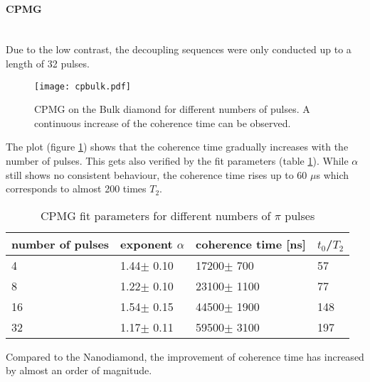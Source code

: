 \documentclass[12pt,a4paper]{article}
\begin{document}
\paragraph{CPMG}\mbox{}\\
Due to the low contrast, the decoupling sequences were only conducted up to a length of 32 pulses. \\
\begin{figure}[H]
\texttt{[image: cpbulk.pdf]} 
\caption{CPMG on the Bulk diamond for different numbers of pulses. A continuous increase of the coherence time can be observed.}
\label{cb}
\end{figure}
The plot (figure \ref{cb}) shows that the coherence time gradually increases with the number of pulses. This gets also verified by the fit parameters (table \ref{c4b}). While $\alpha$ still shows no consistent behaviour, the coherence time rises up to 60 $\mu$s which corresponds to almost 200 times $T_2$.\\
\begin{table}[H]
\centering
\caption{CPMG fit parameters for different numbers of $\pi$ pulses}
\label{c4b}
\begin{tabular}{l|lll}
number of pulses &   exponent $\alpha$   & coherence time {[}ns{]}   & $t_0$/$T_2$   \\\hline
4                &   1.44$\pm$ 0.10      & 17200$\pm$ 700                      & 57 \\
8                &   1.22$\pm$ 0.10      & 23100$\pm$ 1100                    & 77\\
16               &   1.54$\pm$ 0.15      & 44500$\pm$ 1900                     & 148 \\
32               &   1.17$\pm$ 0.11      & 59500$\pm$ 3100                     & 197
\end{tabular}
\end{table}
Compared to the Nanodiamond, the improvement of coherence time has increased by almost an order of magnitude.
\end{document}
